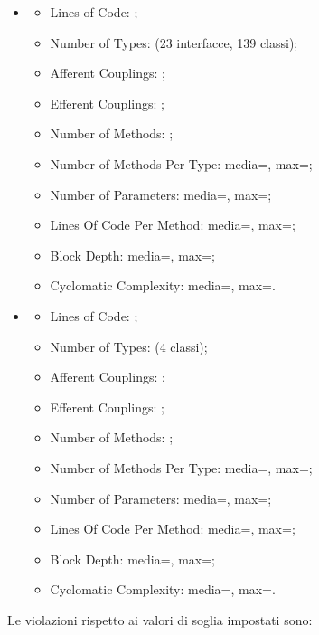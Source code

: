\begin{itemize}
    \item {}
  \begin{itemize}
  \item Lines of Code: ;
  \item Number of Types:  (23 interfacce, 139 classi);
  \item Afferent Couplings: ;
  \item Efferent Couplings: ;
  \item Number of Methods: ;
  \item Number of Methods Per Type: media=, max=;
  \item Number of Parameters: media=, max=;
  \item Lines Of Code Per Method: media=, max=;
  \item Block Depth: media=, max=;
  \item Cyclomatic Complexity: media=, max=.
  \end{itemize}
    \item {}
  \begin{itemize}
  \item Lines of Code: ;
  \item Number of Types:  (4 classi);
  \item Afferent Couplings: ;
  \item Efferent Couplings: ;
  \item Number of Methods: ;
  \item Number of Methods Per Type: media=, max=;
  \item Number of Parameters: media=, max=;
  \item Lines Of Code Per Method: media=, max=;
  \item Block Depth: media=, max=;
  \item Cyclomatic Complexity: media=, max=.
  \end{itemize}
\end{itemize}  


Le violazioni rispetto ai valori di soglia impostati sono:


